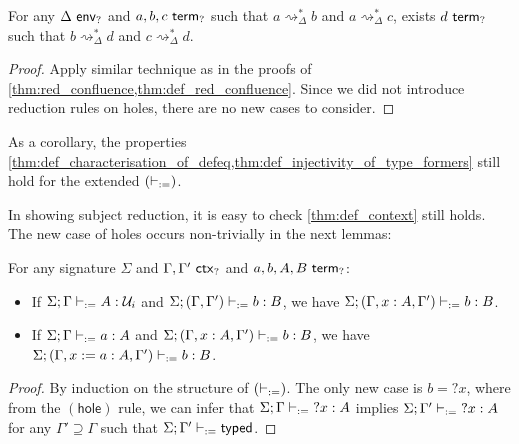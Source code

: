 \documentclass[twoside]{report}
\begin{document}

\begin{proposition}[Confluence]
    \label{thm:hole_red_confluence}
    For any $\Delta \ \mathsf{env}_{?}$ and $a,b,c \ \mathsf{term}_{?}$ such that $a\rightsquigarrow_\Delta^\ast b$ and $a\rightsquigarrow_\Delta^\ast c$, exists $d \ \mathsf{term}_{?}$ such that $b\rightsquigarrow_\Delta^\ast d$ and $c\rightsquigarrow_\Delta^\ast d$.
\end{proposition}

\begin{proof}
    Apply similar technique as in the proofs of \cref{thm:red_confluence,thm:def_red_confluence}. Since we did not introduce reduction rules on holes, there are no new cases to consider.
\end{proof}

As a corollary, the properties \cref{thm:def_characterisation_of_defeq,thm:def_injectivity_of_type_formers} still hold for the extended $(\vdash_{:=})$.

In showing subject reduction, it is easy to check \cref{thm:def_context} still holds. The new case of holes occurs non-trivially in the next lemmas:

\begin{proposition}[Weakening]
    \label{thm:hole_weakening}
    For any signature $\Sigma$ and $\Gamma, \Gamma' \ \mathsf{ctx}_{?}$ and $a, b, A, B \ \mathsf{term}_{?}$:
    \begin{itemize}[noitemsep]
        \item If $\Sigma; \Gamma \vdash_{:=} A : \mathcal U_i$ and $\Sigma; (\Gamma, \Gamma') \vdash_{:=} b : B$, we have $\Sigma; (\Gamma, x : A, \Gamma') \vdash_{:=} b : B$.
        \item If $\Sigma; \Gamma \vdash_{:=} a : A$ and $\Sigma; (\Gamma, x : A, \Gamma') \vdash_{:=} b : B$, we have $\Sigma; (\Gamma, x := a : A, \Gamma') \vdash_{:=} b : B$.
    \end{itemize}
\end{proposition}

\begin{proof}
    By induction on the structure of $(\vdash_{:=})$. The only new case is $b = {?x}$, where from the $(\mathsf{hole})$ rule, we can infer that $\Sigma; \Gamma \vdash_{:=} {?x} : A$ implies $\Sigma; \Gamma' \vdash_{:=} {?x} : A$ for any $\Gamma' \supseteq \Gamma$ such that $\Sigma; \Gamma' \vdash_{:=} \mathsf{typed}$.
\end{proof}
\end{document}

